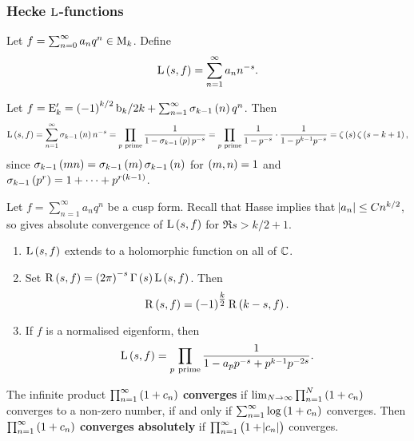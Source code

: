\subsubsection{Hecke \texorpdfstring{$ \mathrm{L} $}{L}-functions}

Let $ f = \sum_{n = 0}^\infty a_nq^n \in \mathrm{M}_k $. Define
$$ \L\br{s, f} = \sum_{n = 1}^\infty a_nn^{-s}. $$

\begin{example*}
Let $ f = \E_k' = \br{-1}^{k / 2}\b_k / 2k + \sum_{n = 1}^\infty \sigma_{k - 1}\br{n}q^n $. Then
$$ \L\br{s, f} = \sum_{n = 1}^\infty \sigma_{k - 1}\br{n}n^{-s} = \prod_{p \ \text{prime}} \dfrac{1}{1 - \sigma_{k - 1}\br{p}p^{-s}} = \prod_{p \ \text{prime}} \dfrac{1}{1 - p^{-s}} \cdot \dfrac{1}{1 - p^{k - 1}p^{-s}} = \zeta\br{s}\zeta\br{s - k + 1}, $$
since $ \sigma_{k - 1}\br{mn} = \sigma_{k - 1}\br{m}\sigma_{k - 1}\br{n} $ for $ \br{m, n} = 1 $ and $ \sigma_{k - 1}\br{p^r} = 1 + \dots + p^{r\br{k - 1}} $.
\end{example*}


Let $ f = \sum_{n = 1}^\infty a_nq^n $ be a cusp form. Recall that Hasse implies that $ \abs{a_n} \le Cn^{k / 2} $, so gives absolute convergence of $ \L\br{s, f} $ for $ \Re s > k / 2 + 1 $.

\begin{theorem}
\label{thm:lfunction}
\hfill
\begin{enumerate}
\item $ \L\br{s, f} $ extends to a holomorphic function on all of $ \mathbb{C} $.
\item Set $ \R\br{s, f} = \br{2\pi}^{-s}\Gamma\br{s}\L\br{s, f} $. Then
$$ \R\br{s, f} = \br{-1}^{\tfrac{k}{2}}\R\br{k - s, f}. $$
\item If $ f $ is a normalised eigenform, then
$$ \L\br{s, f} = \prod_{p \ \text{prime}} \dfrac{1}{1 - a_pp^{-s} + p^{k - 1}p^{-2s}}. $$
\end{enumerate}
\end{theorem}

\pagebreak

\begin{definition}
The infinite product $ \prod_{n = 1}^\infty \br{1 + c_n} $ \textbf{converges} if $ \lim_{N \to \infty} \prod_{n = 1}^N \br{1 + c_n} $ converges to a non-zero number, if and only if $ \sum_{n = 1}^\infty \log \br{1 + c_n} $ converges. Then $ \prod_{n = 1}^\infty \br{1 + c_n} $ \textbf{converges absolutely} if $ \prod_{n = 1}^\infty \br{1 + \abs{c_n}} $ converges.
\end{definition}

